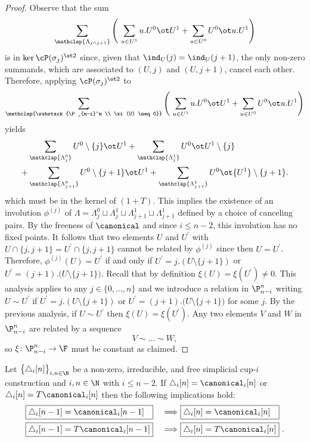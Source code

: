 \begin{proof}
	Observe that the sum
	\[
	\sum_{\mathclap{\Lambda_{j \wedge j+1}}}
	\left(\
	\sum_{u \in U^1} u.U^0 \ot U^1 +
	\sum_{u \in U^0} U^0 \ot u.U^1
	\right)
	\]
	is in $\ker \cP(\sigma_j)^{\ot 2}$ since, given that $\ind_U(j) = \ind_U(j+1)$, the only non-zero summands, which are associated to $(U,j)$ and $(U,j+1)$, cancel each other.
	Therefore, applying $\cP(\sigma_j)^{\ot 2}$ to
	\[
	\sum_{\mathclap{\substack{\P_{n-i}^n \\ \xi(U) \neq 0}}}
	\left(\
	\sum_{u \in U^1} {u.U^0} \ot U^1 +
	\sum_{u \in U^0} {U^0} \ot u.U^1
	\right)
	\]
	yields
	\begin{align*}
		&\sum_{\mathclap{\Lambda_{j}^0}} U^0 \setminus \{j\} \ot U^1	+
		\sum_{\mathclap{\Lambda_{j}^1}} U^0 \ot U^1 \setminus \{j\} \\ +
		&\sum_{\mathclap{\Lambda_{j+1}^0}} U^0 \setminus \{j+1\} \ot U^1 +
		\sum_{\mathclap{\Lambda_{j+1}^1}} U^0 \ot {U^1} \setminus \{j+1\}.
	\end{align*}
	which must be in the kernel of $(1+T)$.
	This implies the existence of an involution $\phi^{(j)}$ of $\Lambda = \Lambda^0_{j} \sqcup \Lambda^1_{j} \sqcup \Lambda^1_{j+1} \sqcup \Lambda^1_{j+1}$ defined by a choice of canceling pairs.
	By the freeness of $\canonical$ and since $i \leq n-2$, this involution has no fixed points.
	It follows that two elements $U$ and $U^\prime$ with $U \cap \{j, j+1\} = U^\prime \cap \{j, j+1\}$ cannot be related by $\phi^{(j)}$ since then $U = U^\prime$.
	Therefore, $\phi^{(j)}(U) = U^\prime$ if and only if $U^\prime = j.(U \setminus \{j+1\})$ or $U^\prime = (j+1).\big( U \setminus \{j+1\} \big)$.
	Recall that by definition $\xi(U) = \xi(U^\prime) \neq 0$.
	This analysis applies to any $j \in \{0, \dots, n\}$ and we introduce a relation in $\P_{n-i}^n$ writing $U \sim U^\prime$ if $U^\prime = j.(U \setminus \{j+1\})$ or $U^\prime = (j+1).\big( U \setminus \{j+1\} \big)$ for some $j$.
	By the previous analysis, if $U \sim U^\prime$ then $\xi(U) = \xi(U^\prime)$.
	Any two elements $V$ and $W$ in $\P_{n-i}^n$ are related by a sequence
	\[
	V \sim \dots \sim W,
	\]
	so $\xi \colon \P_{n-i}^n \to \F$ must be constant as claimed.
\end{proof}

\begin{lemma}\label{l:second nail}
	Let $\big\{ \triangle_i [n] \big\}_{i,n\in\N}$ be a non-zero, irreducible, and free simplicial \mbox{cup-$i$} construction and $i,n \in \N$ with $i \leq n-2$.
	If $\triangle_i [n] = \canonical_i [n]$ or $\triangle_i [n] = T \canonical_i [n]$ then the following implications hold:
	\begin{alignat*}{2}
		&\boxed{\triangle_i [n-1] = \canonical_i [n-1] \kern 7.3pt}\ &\Longrightarrow\
		&\boxed{\triangle_i [n] = \canonical_i [n] \kern 7.3pt} \\
		&\boxed{\triangle_i [n-1] = T \canonical_i [n-1]}\ &\Longrightarrow\
		&\boxed{\triangle_i [n] = T \canonical_i [n]} \ .
	\end{alignat*}
\end{lemma}

